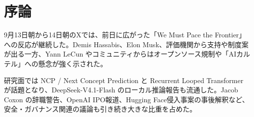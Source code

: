 \section{序論}
9月13日朝から14日朝のXでは、前日に広がった「We Must Pace the Frontier」への反応が継続した。Demis Hassabis、Elon Musk、評価機関から支持や制度案が出る一方、Yann LeCun やコミュニティからはオープンソース規制や「AIカルテル」への懸念が強く示された。

研究面では NCP / Next Concept Prediction と Recurrent Looped Transformer が話題となり、DeepSeek-V4.1-Flash のローカル推論報告も流通した。Jacob Coxon の辞職警告、OpenAI IPO報道、Hugging Face侵入事案の事後解釈など、安全・ガバナンス関連の議論も引き続き大きな比重を占めた。
